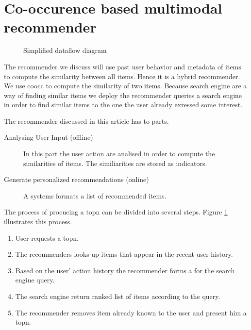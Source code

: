 \section{Co-occurence based multimodal recommender}
\label{sec:design}
\begin{figure}
  \centering
  \caption{Simplified dataflow diagram}
  \label{fig:topndataflow}
\end{figure}

The recommender we discuss will use past user behavior and metadata of items to compute the similarity between all items. Hence it is a hybrid recommender.
We use \gls{coocc} to compute the similarity of two items. Because search engine are a way of finding similar items we deploy the recommender queries a search engine in order to find similar items to the one the user already exressed some interest.

The recommender discussed in this article has to parts.
\begin{description}
\item[Analysing User Input (offline)] In this part the user action are analised in order to compute the similarities of items. The similiarities are stored as indicators.
\item[Generate personalized recommendations (online)] A systems formats a list of recommended items.
\end{description}


The process of procucing a \gls{topn} can be divided into several steps. Figure \ref{fig:topndataflow} illustrates this process.

\begin{enumerate}
\item User requests a \gls{topn}.
\item The recommenders looks up items that appear in the recent user history.
\item Based on the user' action history the recommender forms a for the search engine query.
\item The search engine return ranked list of items according to the query.
\item The recommender removes item already known to the user and present him a \gls{topn}.
\end{enumerate}

